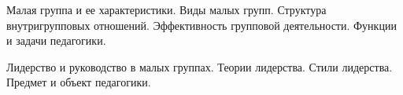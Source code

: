 \documentclass[
	14pt,
	a4paper,
	]
	{scrartcl}
\begin{document}
\vfill

\newpage


\shapk
{}
\setcounter{zad}{0}

\vfill
\z 	Малая группа и ее характеристики. Виды малых групп. Структура внутригрупповых отношений. Эффективность групповой деятельности.
 \vfill
\z 	Функции и задачи педагогики.
 \vfill

\vfill

\newpage


\shapk
{}
\setcounter{zad}{0}

\vfill
\z 	Лидерство и руководство в малых группах. Теории лидерства. Стили лидерства.
 \vfill
\z 	Предмет и объект педагогики.
 \vfill

\vfill

\newpage
\end{document}
